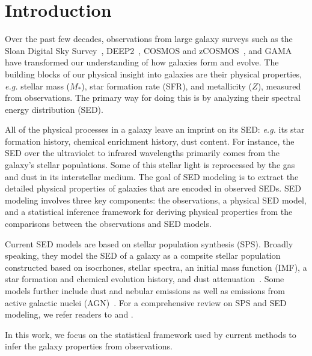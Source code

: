 \section{Introduction} \label{sec:intro} 
Over the past few decades, observations from large galaxy surveys such as the
Sloan Digital Sky Survey~\citep[SDSS;][]{york2000}, DEEP2~\citep{davis2003},
COSMOS and zCOSMOS~\citep{scoville2007, lilly2007}, and GAMA~\citep{baldry2018}
have transformed our understanding of how galaxies form and evolve. 
The building blocks of our physical insight into galaxies are their 
physical properties, \emph{e.g.} stellar mass ($M_*$), star formation rate
(SFR), and metallicity ($Z$), measured from observations.
The primary way for doing this is by analyzing their spectral energy
distribution (SED).

All of the physical processes in a galaxy leave an imprint on its SED:
\emph{e.g.} its star formation history, chemical enrichment history, dust
content. 
For instance, the SED over the ultraviolet to infrared wavelengths primarily
comes from the galaxy's stellar populations. 
Some of this stellar light is reprocessed by the gas and dust in its
interstellar medium.
The goal of SED modeling is to extract the detailed physical properties of
galaxies that are encoded in observed SEDs. 
SED modeling involves three key components: the observations, a physical SED
model, and a statistical inference framework for deriving physical properties 
from the comparisons between the observations and SED models.

Current SED models are based on stellar population synthesis (SPS).
Broadly speaking, they model the SED of a galaxy as a compsite stellar
population constructed based on isocrhones, stellar spectra, an initial mass
function (IMF), a star formation and chemical evolution history, and dust
attenuation~\citep[\emph{e.g.}][]{bruzual2003, maraston2005, conroy2009,
eldridge2017}.
Some models further include dust and nebular emissions as well as emissions
from active galactic nuclei (AGN)~\citep[\emph{e.g.}][]{johnson2021}.
For a comprehensive review on SPS and SED modeling, we refer readers to
\cite{walcher2011} and \cite{conroy2013}. 

In this work, we focus on the statistical framework used by current methods to
infer the galaxy properties from observations. 

